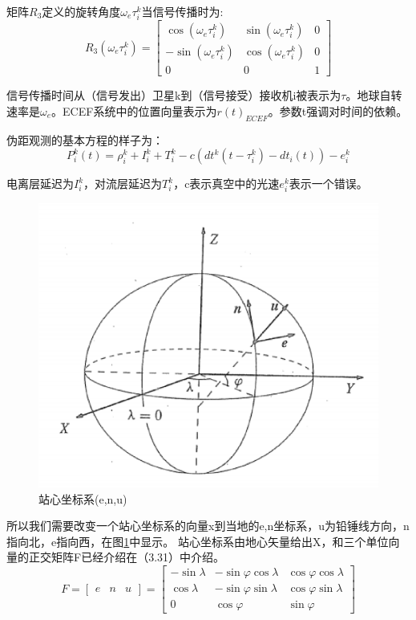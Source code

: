 	矩阵$R_3$定义的旋转角度$\omega_e \tau^k_i$当信号传播时为:
	\begin{equation}\label{eq:9.18}
	R_3(\omega_e\tau^k_i) =
	\begin{bmatrix}
	\cos(\omega_e\tau^k_i) & \sin(\omega_e\tau^k_i) & 0 \\
	-\sin(\omega_e\tau^k_i) & \cos(\omega_e\tau^k_i) & 0 \\
	0 & 0 & 1
	\end{bmatrix}
	\end{equation}
	
	信号传播时间从（信号发出）卫星k到（信号接受）接收机i被表示为$\tau$。地球自转速率是$\omega_e$。ECEF系统中的位置向量表示为$r(t)_{ECEF}$。参数t强调对时间的依赖。
	
	伪距观测的基本方程的样子为：
	\begin{equation}\label{eq:9.19}
	P^k_i(t) = \rho^k_i+I^k_i+T^k_i-c(dt^k(t-\tau^k_i)-dt_i(t))-e^k_i
	\end{equation}
	
	电离层延迟为$I^k_i$，对流层延迟为$T^k_i$，c表示真空中的光速$e^k_i$表示一个错误。
	\begin{figure}
		\centering
		\includegraphics[width=0.7\linewidth]{TeX_files/Part03/chapter09/image/9-13}
		\caption{站心坐标系(e,n,u)}
		\label{fig:9-13}
	\end{figure}
	
	所以我们需要改变一个站心坐标系的向量x到当地的e,n坐标系，u为铅锤线方向，n指向北，e指向西，在图\ref{fig:9-13}中显示。 站心坐标系由地心矢量给出X，和三个单位向量的正交矩阵F已经介绍在（3.31）中介绍。
	\begin{equation}\label{eq:9.20}
	F = \begin{bmatrix}
	e & n & u
	\end{bmatrix}=
	\begin{bmatrix}
	-\sin \lambda & -\sin\varphi\cos\lambda & \cos\varphi\cos\lambda \\
	\cos \lambda & -\sin\varphi\sin\lambda & \cos\varphi\sin\lambda \\
	0 & \cos\varphi & \sin\varphi
	\end{bmatrix}
	\end{equation}
	
